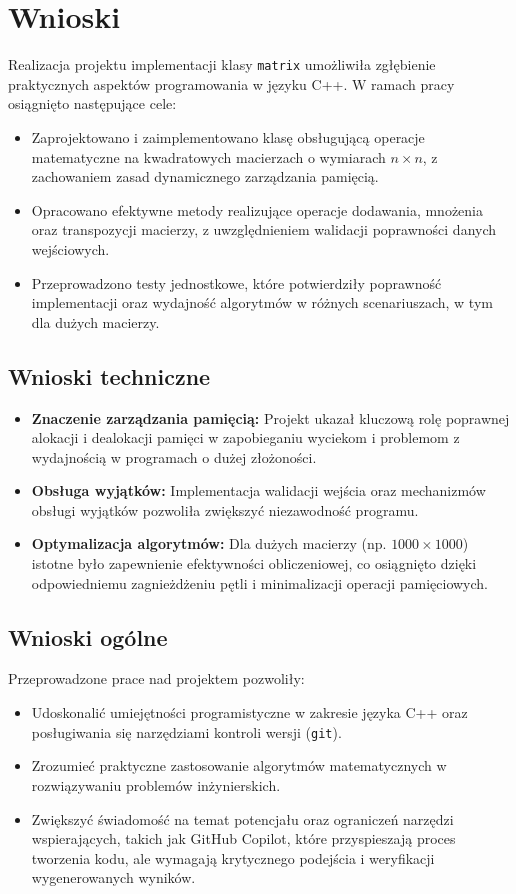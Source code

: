 \newpage
\section{Wnioski}	%
Realizacja projektu implementacji klasy \texttt{matrix} umożliwiła zgłębienie praktycznych aspektów programowania w języku C++. W ramach pracy osiągnięto następujące cele:
\begin{itemize}
  \item Zaprojektowano i zaimplementowano klasę obsługującą operacje matematyczne na kwadratowych macierzach o wymiarach \(n \times n\), z zachowaniem zasad dynamicznego zarządzania pamięcią.
  \item Opracowano efektywne metody realizujące operacje dodawania, mnożenia oraz transpozycji macierzy, z uwzględnieniem walidacji poprawności danych wejściowych.
  \item Przeprowadzono testy jednostkowe, które potwierdziły poprawność implementacji oraz wydajność algorytmów w różnych scenariuszach, w tym dla dużych macierzy.
\end{itemize}

\subsection{Wnioski techniczne}
\begin{itemize}
  \item \textbf{Znaczenie zarządzania pamięcią:}
        Projekt ukazał kluczową rolę poprawnej alokacji i dealokacji pamięci w zapobieganiu wyciekom i problemom z wydajnością w programach o dużej złożoności.
  \item \textbf{Obsługa wyjątków:}
        Implementacja walidacji wejścia oraz mechanizmów obsługi wyjątków pozwoliła zwiększyć niezawodność programu.
  \item \textbf{Optymalizacja algorytmów:}
        Dla dużych macierzy (np. \(1000 \times 1000\)) istotne było zapewnienie efektywności obliczeniowej, co osiągnięto dzięki odpowiedniemu zagnieżdżeniu pętli i minimalizacji operacji pamięciowych.
\end{itemize}

\subsection{Wnioski ogólne}
Przeprowadzone prace nad projektem pozwoliły:
\begin{itemize}
  \item Udoskonalić umiejętności programistyczne w zakresie języka C++ oraz posługiwania się narzędziami kontroli wersji (\texttt{git}).
  \item Zrozumieć praktyczne zastosowanie algorytmów matematycznych w rozwiązywaniu problemów inżynierskich.
  \item Zwiększyć świadomość na temat potencjału oraz ograniczeń narzędzi wspierających, takich jak GitHub Copilot, które przyspieszają proces tworzenia kodu, ale wymagają krytycznego podejścia i weryfikacji wygenerowanych wyników.
\end{itemize}

